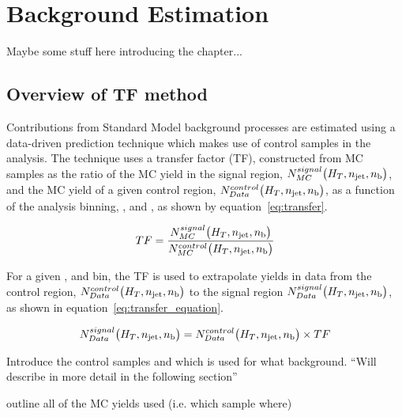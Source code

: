 \chapter{Background Estimation}
\label{ch:6}

\ifpdf
    \graphicspath{{Chapter6/Figs/Raster/}{Chapter6/Figs/PDF/}{Chapter6/Figs/}}
\else
    \graphicspath{{Chapter6/Figs/Vector/}{Chapter6/Figs/}}
\fi

Maybe some stuff here introducing the chapter...

\section{Overview of TF method}  %
\label{sec:background_overview}

Contributions from Standard Model background processes are estimated using a data-driven 
prediction technique which makes use of control samples in the analysis. The 
technique uses a transfer factor (TF), constructed from MC samples as the ratio 
of the MC yield in the signal region, $N_{MC}^{signal}\big(H_T, n_{\text{jet}}, n_{\text{b}}\big)$,
and the MC yield of a given control region, $N_{Data}^{control}\big(H_T, n_{\text{jet}}, n_{\text{b}}\big)$,
as a function of the analysis binning, \HT, \nj and \nb, as shown by
equation~\ref{eq:transfer}.

\begin{equation}
TF = \frac{N_{MC}^{signal}\big(H_T, n_{\text{jet}}, n_{\text{b}}\big)}{N_{MC}^{control}\big(H_T, n_{\text{jet}}, n_{\text{b}}\big)}
\label{eq:transfer_factor}
\end{equation}

For a given \HT, \nj and \nb bin, the TF is used to extrapolate yields in data from
the control region, $N_{Data}^{control}\big(H_T, n_{\text{jet}}, n_{\text{b}}\big)$
to the signal region $N_{Data}^{signal}\big(H_T, n_{\text{jet}}, n_{\text{b}}\big)$, as shown in
equation~\ref{eq:transfer_equation}.

\begin{equation}
N_{Data}^{signal}\big(H_T, n_{\text{jet}}, n_{\text{b}}\big) = N_{Data}^{control}\big(H_T, n_{\text{jet}}, n_{\text{b}}\big)
\times TF
\label{eq:transfer_equation}
\end{equation}


Introduce the control samples and which is used for what background. ``Will 
describe in more detail in the following section''

outline all of the MC yields used (i.e. which sample where)

